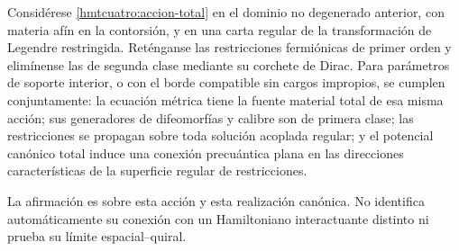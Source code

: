 \begin{theorem}
\label{hmtcuatro:teorema-canonico-total}
Considérese \eqref{hmtcuatro:accion-total} en el dominio no degenerado
anterior, con materia afín en la contorsión, y en una carta regular de
la transformación de Legendre restringida. Reténganse las restricciones
fermiónicas de primer orden y elimínense las de segunda clase mediante
su corchete de Dirac. Para parámetros de soporte interior, o con el
borde compatible sin cargos impropios, se cumplen conjuntamente:
la ecuación métrica tiene la fuente material total de esa misma acción;
sus generadores de difeomorfías y calibre son de primera clase; las
restricciones se propagan sobre toda solución acoplada regular; y el
potencial canónico total induce una conexión precuántica plana en las
direcciones características de la superficie regular de restricciones.

La afirmación es sobre esta acción y esta realización canónica.
No identifica automáticamente su conexión con un Hamiltoniano
interactuante distinto ni prueba su límite espacial--quiral.
\end{theorem}

